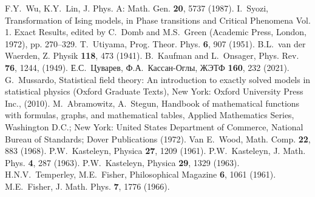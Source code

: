 \documentclass[utf8,12pt]{jetp}
\begin{document}
\begin{references}
 F.Y.~Wu, K.Y.~Lin, J. Phys. A: Math. Gen. \textbf{20}, 5737 (1987).
 I.~Syozi, Transformation of Ising models, in Phase transitions and Critical Phenomena Vol. 1. Exact Results, edited by C.~Domb and M.S.~Green (Academic Press, London, 1972), pp. 270–329.
 T.~Utiyama, Prog. Theor. Phys. \textbf{6}, 907 (1951).
 B.L.~van der Waerden, Z. Physik \textbf{118}, 473 (1941).
 B.~Kaufman and L.~Onsager, Phys. Rev. \textbf{76}, 1244, (1949).
 Е.С.~Цуварев, Ф.А.~Кассан-Оглы, ЖЭТФ \textbf{160}, 232 (2021).
  G.~Mussardo, Statistical field theory: An introduction to exactly solved models in statistical physics (Oxford Graduate Texts), New York: Oxford University Press Inc., (2010).
 M.~Abramowitz, A.~Stegun, Handbook of mathematical functions with formulas, graphs, and mathematical tables, Applied Mathematics Series, Washington D.C.; New York: United States Department of Commerce, National Bureau of Standards; Dover Publications (1972).
 Van E.~Wood, Math. Comp. \textbf{22}, 883 (1968).
 P.W.~Kasteleyn, Physica \textbf{27}, 1209 (1961).
 P.W.~Kasteleyn, J. Math. Phys. \textbf{4}, 287 (1963).
 P.W.~Kasteleyn, Physica \textbf{29}, 1329 (1963).
 H.N.V.~Temperley, M.E.~Fisher, Philosophical Magazine \textbf{6}, 1061 (1961).
 M.E.~Fisher, J. Math. Phys. \textbf{7}, 1776 (1966).
\end{references}
	
\end{document}
